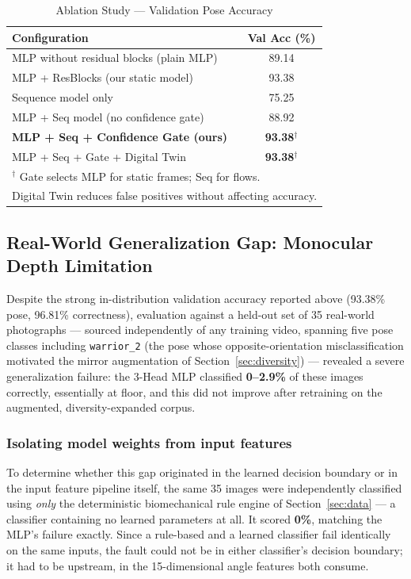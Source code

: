 \documentclass[conference]{IEEEtran}
\begin{document}
\begin{table}[!t]
\centering
\caption{Ablation Study --- Validation Pose Accuracy}
\label{tab:ablation}
\begin{tabular}{@{}lc@{}}
\toprule
\textbf{Configuration} & \textbf{Val Acc (\%)} \\
\midrule
MLP without residual blocks (plain MLP) & 89.14 \\
MLP + ResBlocks (our static model) & 93.38 \\
Sequence model only & 75.25 \\
MLP + Seq model (no confidence gate) & 88.92 \\
\textbf{MLP + Seq + Confidence Gate (ours)} & \textbf{93.38}$^{\dagger}$ \\
MLP + Seq + Gate + Digital Twin & \textbf{93.38}$^{\dagger}$ \\
\bottomrule
\multicolumn{2}{l}{\scriptsize $^{\dagger}$ Gate selects MLP for static frames; Seq for flows.}\\
\multicolumn{2}{l}{\scriptsize Digital Twin reduces false positives without affecting accuracy.}
\end{tabular}
\end{table}

\subsection{Real-World Generalization Gap: Monocular Depth Limitation}
\label{sec:depth-limitation}

Despite the strong in-distribution validation accuracy reported above (93.38\% pose,
96.81\% correctness), evaluation against a held-out set of 35 real-world photographs
--- sourced independently of any training video, spanning five pose classes including
\texttt{warrior\_2} (the pose whose opposite-orientation misclassification motivated
the mirror augmentation of Section~\ref{sec:diversity}) --- revealed a severe
generalization failure: the 3-Head MLP classified \textbf{0--2.9\%} of these images
correctly, essentially at floor, and this did not improve after retraining on the
augmented, diversity-expanded corpus.

\subsubsection{Isolating model weights from input features}
To determine whether this gap originated in the learned decision boundary or in the
input feature pipeline itself, the same 35 images were independently classified using
\emph{only} the deterministic biomechanical rule engine of Section~\ref{sec:data}
--- a classifier containing no learned parameters at all. It scored \textbf{0\%},
matching the MLP's failure exactly. Since a rule-based and a learned classifier fail
identically on the same inputs, the fault could not be in either classifier's decision
boundary; it had to be upstream, in the 15-dimensional angle features both consume.
\end{document}
